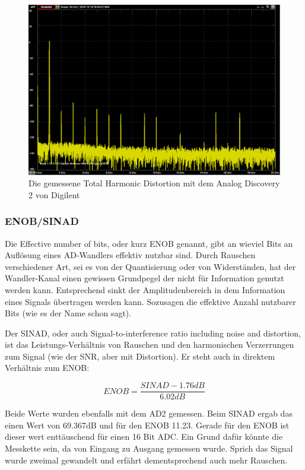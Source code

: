 \begin{figure} [H]
\begin{center}
 \includegraphics[width=\textwidth]{../graphics/THD_LineINOUT.png}
 \caption{Die gemessene Total Harmonic Distortion mit dem Analog Discovery 2 von Digilent}
\label{fig:thdAD2}
\end{center}
\end{figure}

\subsubsection{ENOB/SINAD}
\label{subsubsec:ENOB/SINAD}

Die \glqq Effective number of bits\grqq, oder kurz ENOB genannt, gibt an wieviel Bits an Auflösung eines AD-Wandlers effektiv nutzbar sind. Durch Rauschen verschiedener Art, sei es von der Quantisierung oder von Widerständen, hat der Wandler-Kanal einen gewissen Grundpegel der nicht für Information genutzt werden kann. Entsprechend sinkt der Amplitudenbereich in dem Information eines Signals übertragen werden kann. Sozusagen die effektive Anzahl nutzbarer Bits (wie es der Name schon sagt).

Der SINAD, oder auch \glqq Signal-to-interference ratio including noise and distortion\grqq , ist das Leistungs-Verhältnis  von Rauschen und den harmonischen Verzerrungen zum Signal (wie der SNR, aber mit Distortion). Er steht auch in direktem Verhältnis zum ENOB:

\begin{equation}
ENOB=\frac{SINAD-1.76dB}{6.02dB}
\end{equation} 

Beide Werte wurden ebenfalls mit dem AD2 gemessen. Beim SINAD ergab das einen Wert von 69.367dB und für den ENOB 11.23. Gerade für den ENOB ist dieser wert enttäuschend für einen 16 Bit ADC. Ein Grund dafür könnte die Messkette sein, da von Eingang zu Ausgang gemessen wurde. Sprich das Signal wurde zweimal gewandelt und erfährt dementsprechend auch mehr Rauschen. 
